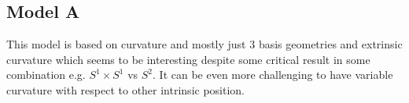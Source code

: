 \documentclass[stu, babel, american, biblatex, a4paper, leqno, draftall]{apa7}
\begin{document}
\subsection{Model A}
This model is based on curvature and mostly just 3 basis geometries and extrinsic curvature which seems to be interesting despite some critical result in some combination e.g. $S^1 \times S^1$ vs $S^2$. It can be even more challenging to have variable curvature with respect to other intrinsic position.
\section*{}
\printbibliography

\end{document}
